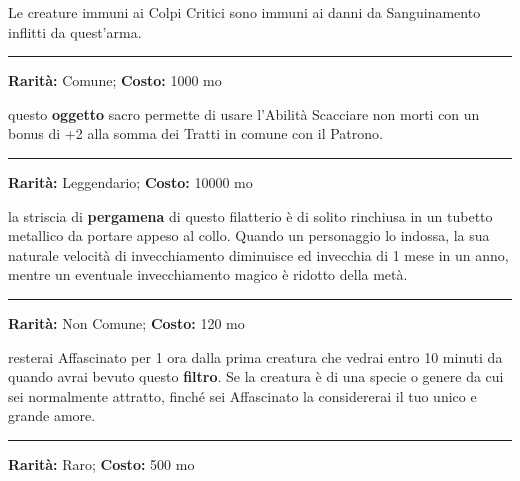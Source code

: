 \begin{multicols}{2}
Le creature immuni ai Colpi Critici sono immuni ai danni da Sanguinamento inflitti da quest'arma.

\smallskip\noindent\rule{\linewidth}{2pt}  \hypertarget{Filatteriocontroinonmorti}{}\medskip{}\noindent\label{Filatteriocontroinonmorti}

\textbf{Rarità:} Comune; \textbf{Costo:} 1000 mo

questo \textbf{oggetto} sacro permette di usare l'Abilità Scacciare non morti con un bonus di +2 alla somma dei Tratti in comune con il Patrono.

\smallskip\noindent\rule{\linewidth}{2pt}  \hypertarget{Filatteriodellagiovinezza}{}\medskip{}\noindent\label{Filatteriodellagiovinezza}

\textbf{Rarità:} Leggendario; \textbf{Costo:} 10000 mo

la striscia di \textbf{pergamena} di questo filatterio è di solito rinchiusa in un tubetto metallico da portare appeso al collo. Quando un personaggio lo indossa, la sua naturale velocità di invecchiamento diminuisce ed invecchia di 1 mese in un anno, mentre un eventuale invecchiamento magico è ridotto della metà.

\smallskip\noindent\rule{\linewidth}{2pt}  \hypertarget{Filtrod'Amore}{}\medskip{}\noindent\label{Filtrod'Amore}

\textbf{Rarità:} Non Comune; \textbf{Costo:} 120 mo

resterai Affascinato per 1 ora dalla prima creatura che vedrai entro 10 minuti da quando avrai bevuto questo \textbf{filtro}. Se la creatura è di una specie o genere da cui sei normalmente attratto, finché sei Affascinato la considererai il tuo unico e grande amore.

\smallskip\noindent\rule{\linewidth}{2pt}  \hypertarget{FiltroScopritesori}{}\medskip{}\noindent\label{FiltroScopritesori}

\textbf{Rarità:} Raro; \textbf{Costo:} 500 mo


\end{multicols}
